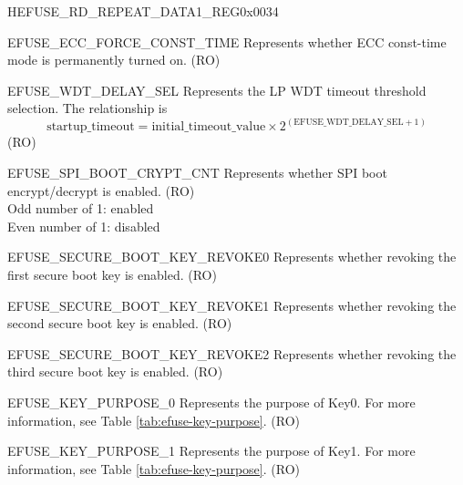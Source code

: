 \begin{register}{H}{EFUSE\_RD\_REPEAT\_DATA1\_REG}{0x0034}
\begin{regdesc}
\begin{reglist}
\label{fielddesc:EFUSEECCFORCECONSTTIME}\item [EFUSE\_ECC\_FORCE\_CONST\_TIME] Represents whether ECC const-time mode is permanently turned on. (RO)
\label{fielddesc:EFUSEWDTDELAYSEL}\item [EFUSE\_WDT\_DELAY\_SEL] Represents the LP WDT timeout threshold selection. The relationship is
\[
    \text{startup\_timeout} = \text{initial\_timeout\_value} \times 2^{(\text{EFUSE\_WDT\_DELAY\_SEL} + 1)}
    \]
(RO)
\label{fielddesc:EFUSESPIBOOTCRYPTCNT}\item [EFUSE\_SPI\_BOOT\_CRYPT\_CNT] Represents whether SPI boot encrypt/decrypt is enabled. (RO)\\Odd number of 1: enabled\\Even number of 1: disabled
\label{fielddesc:EFUSESECUREBOOTKEYREVOKE0}\item [EFUSE\_SECURE\_BOOT\_KEY\_REVOKE0] Represents whether revoking the first secure boot key is enabled. (RO)
\label{fielddesc:EFUSESECUREBOOTKEYREVOKE1}\item [EFUSE\_SECURE\_BOOT\_KEY\_REVOKE1] Represents whether revoking the second secure boot key is enabled. (RO)
\label{fielddesc:EFUSESECUREBOOTKEYREVOKE2}\item [EFUSE\_SECURE\_BOOT\_KEY\_REVOKE2] Represents whether revoking the third secure boot key is enabled. (RO)
\label{fielddesc:EFUSEKEYPURPOSE0}\item [EFUSE\_KEY\_PURPOSE\_0] Represents the purpose of Key0. For more information, see Table \ref{tab:efuse-key-purpose}. (RO)
\label{fielddesc:EFUSEKEYPURPOSE1}\item [EFUSE\_KEY\_PURPOSE\_1] Represents the purpose of Key1. For more information, see Table \ref{tab:efuse-key-purpose}. (RO)
\end{reglist}\end{regdesc}
\end{register}


